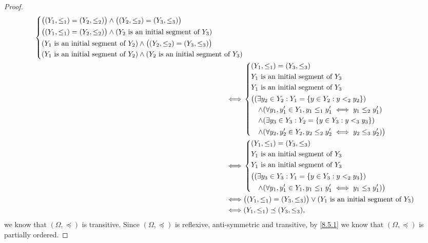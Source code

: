\begin{proof}
\begin{align*}
\begin{dcases}
             \big((Y_1, \leq_1) = (Y_2, \leq_2)\big) \land \big((Y_2, \leq_2) = (Y_3, \leq_3)\big)     \\
             \big((Y_1, \leq_1) = (Y_2, \leq_2)\big) \land (Y_2 \text{ is an initial segment of } Y_3) \\
             (Y_1 \text{ is an initial segment of } Y_2) \land \big((Y_2, \leq_2) = (Y_3, \leq_3)\big) \\
             (Y_1 \text{ is an initial segment of } Y_2) \land (Y_2 \text{ is an initial segment of } Y_3)
           \end{dcases}                                                                      \\
    \iff & \begin{dcases}
             (Y_1, \leq_1) = (Y_3, \leq_3)                                                 \\
             Y_1 \text{ is an initial segment of } Y_3                                     \\
             Y_1 \text{ is an initial segment of } Y_3                                     \\
             \big((\exists y_2 \in Y_2 : Y_1 = \left\lbrace y \in Y_2 : y <_2 y_2\right\rbrace)                \\
             \quad \land (\forall y_1, y_1' \in Y_1, y_1 \leq_1 y_1' \iff y_1 \leq_2 y_1') \\
             \quad \land (\exists y_3 \in Y_3 : Y_2 = \left\lbrace y \in Y_3 : y <_3 y_3\right\rbrace)         \\
             \quad \land (\forall y_2, y_2' \in Y_2, y_2 \leq_2 y_2' \iff y_2 \leq_3 y_2')\big)
           \end{dcases}                                                                                 \\
    \iff & \begin{dcases}
             (Y_1, \leq_1) = (Y_3, \leq_3)                                  \\
             Y_1 \text{ is an initial segment of } Y_3                      \\
             Y_1 \text{ is an initial segment of } Y_3                      \\
             \big((\exists y_3 \in Y_3 : Y_1 = \left\lbrace y \in Y_3 : y <_2 y_3\right\rbrace) \\
             \quad \land (\forall y_1, y_1' \in Y_1, y_1 \leq_1 y_1' \iff y_1 \leq_3 y_1')\big)
           \end{dcases}                                                                                 \\
    \iff & \big((Y_1, \leq_1) = (Y_3, \leq_3)\big) \lor (Y_1 \text{ is an initial segment of } Y_3)                                                                          \\
    \iff & (Y_1, \leq_1) \preceq (Y_3, \leq_3),
  \end{align*}
  we know that \((\Omega, \preceq)\) is transitive.
  Since \((\Omega, \preceq)\) is reflexive, anti-symmetric and transitive, by \cref{8.5.1} we know that \((\Omega, \preceq)\) is partially ordered.


\end{proof}
